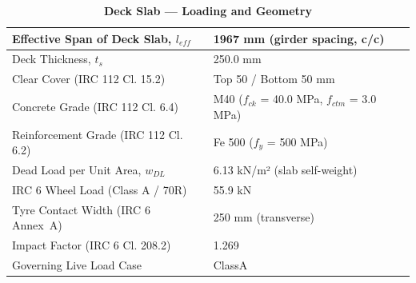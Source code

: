 \documentclass[12pt,a4paper]{report}
\numberwithin{table}{chapter}
\numberwithin{figure}{chapter}
\begin{document}
\vspace{1em}
\begin{longtable}{|L{5.5cm}|p{10.0cm}|}
\caption{\textbf{Deck Slab --- Loading and Geometry}}
\hline
\textnormal{Effective Span of Deck Slab, $l_{eff}$} & 1967 mm (girder spacing, c/c) \\[6pt]
\hline
\textnormal{Deck Thickness, $t_s$} & 250.0 mm \\[6pt]
\hline
\textnormal{Clear Cover (IRC 112 Cl. 15.2)} & Top 50 / Bottom 50 mm \\[6pt]
\hline
\textnormal{Concrete Grade (IRC 112 Cl. 6.4)} & M40 ($f_{ck}$ = 40.0 MPa, $f_{ctm}$ = 3.0 MPa) \\[6pt]
\hline
\textnormal{Reinforcement Grade (IRC 112 Cl. 6.2)} & Fe 500 ($f_y$ = 500 MPa) \\[6pt]
\hline
\textnormal{Dead Load per Unit Area, $w_{DL}$} & 6.13 kN/m² (slab self-weight) \\[6pt]
\hline
\textnormal{IRC 6 Wheel Load (Class A / 70R)} & 55.9 kN \\[6pt]
\hline
\textnormal{Tyre Contact Width (IRC 6 Annex~A)} & 250 mm (transverse) \\[6pt]
\hline
\textnormal{Impact Factor (IRC 6 Cl. 208.2)} & 1.269 \\[6pt]
\hline
\textnormal{Governing Live Load Case} & ClassA \\[6pt]
\hline
\end{longtable}
\end{document}
